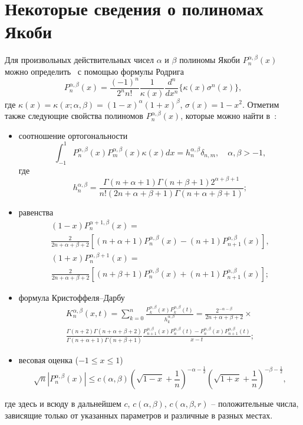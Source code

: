 \section{Некоторые сведения о полиномах Якоби}
Для произвольных действительных чисел $\alpha$ и $\beta$ полиномы Якоби $P_n^{\alpha,\beta}(x)$ можно определить~\cite{Ram-Sege} с помощью формулы Родрига
$$
P_n^{\alpha,\beta}(x)=\frac{(-1)^n}{2^nn!}\frac{1}{\kappa(x)}\frac{d^n}{dx^n}\{\kappa(x)\sigma^n(x)\},
$$
где $\kappa(x)=\kappa(x;\alpha,\beta)=(1-x)^\alpha(1+x)^\beta$, $\sigma(x)=1-x^2$. Отметим также следующие свойства полиномов $P_n^{\alpha,\beta}(x)$, которые можно найти в~\cite{Ram-Sege}:
\begin{itemize}
	\item
	соотношение ортогональности
	$$
	\int_{-1}^{1}P_n^{\alpha,\beta}(x)P_m^{\alpha,\beta}(x)\kappa(x)dx=h_n^{\alpha,\beta}\delta_{n,m},\quad \alpha, \beta>-1,
	$$
	где
	$$
	h_n^{\alpha,\beta}=\frac{\Gamma(n+\alpha+1)\Gamma(n+\beta+1)2^{\alpha+\beta+1}}{n!(2n+\alpha+\beta+1)\Gamma(n+\alpha+\beta+1)};
	$$
	
	\item
	равенства
	\begin{multline}\label{alpha_1}
	(1-x)P_n^{\alpha+1,\beta}(x)=\\
	\frac{2}{2n+\alpha+\beta+2}\left[(n+\alpha+1)P_n^{\alpha,\beta}(x)-(n+1)P_{n+1}^{\alpha,\beta}(x)\right],
	\end{multline}
	\begin{multline}\label{beta_1}
	(1+x)P_n^{\alpha,\beta+1}(x)=\\
	\frac{2}{2n+\alpha+\beta+2}\left[(n+\beta+1)P_n^{\alpha,\beta}(x)+(n+1)P_{n+1}^{\alpha,\beta}(x)\right];
	\end{multline}
	
	\item
	формула Кристоффеля--Дарбу
	\begin{multline}\label{Kris_Dar}
	K_n^{\alpha,\beta}(x,t)=\sum_{k=0}^{n}\frac{P_k^{\alpha,\beta}(x)P_k^{\alpha,\beta}(t)}{h_k^{\alpha,\beta}}=\frac{2^{-\alpha-\beta}}{2n+\alpha+\beta+2}\times\\
	\frac{\Gamma(n+2)\Gamma(n+\alpha+\beta+2)}{\Gamma(n+\alpha+1)\Gamma(n+\beta+1)}
	\frac{P_{n+1}^{\alpha,\beta}(x)P_n^{\alpha,\beta}(t)-P_n^{\alpha,\beta}(x)P_{n+1}^{\alpha,\beta}(t)}{x-t};
	\end{multline}
	
	\item
	весовая оценка ($-1\le x\le1$)
	\begin{equation*}
	\sqrt{n}|P_n^{\alpha,\beta}(x)|\le c(\alpha,\beta)\left(\sqrt{1-x}+\frac{1}{n}\right)^{-\alpha-\frac12}
	\left(\sqrt{1+x}+\frac{1}{n}\right)^{-\beta-\frac12},
	\end{equation*}
\end{itemize}
где здесь и всюду в дальнейшем $c$, $c(\alpha,\beta)$, $c(\alpha,\beta,r)$ -- положительные числа, зависящие только от указанных параметров и различные в разных местах.

